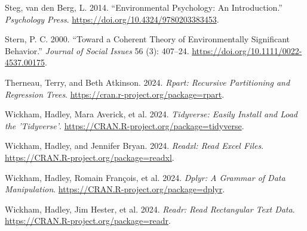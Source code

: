 \documentclass[
  letterpaper,
  DIV=11,
  numbers=noendperiod]{scrartcl}
\newlength{\cslhangindent}
\newenvironment{CSLReferences}[2] %
 {\begin{list}{}{%
  \setlength{\itemindent}{0pt}
  \setlength{\leftmargin}{0pt}
  \setlength{\parsep}{0pt}
  \ifodd #1
   \setlength{\leftmargin}{\cslhangindent}
   \setlength{\itemindent}{-1\cslhangindent}
  \fi
  \setlength{\itemsep}{#2\baselineskip}}}
 {\end{list}}
\begin{document}
\begin{CSLReferences}{1}{0}
Steg, van den Berg, L. 2014. {``Environmental Psychology: An
Introduction.''} \emph{Psychology Press}.
\url{https://doi.org/10.4324/9780203383453}.

Stern, P. C. 2000. {``Toward a Coherent Theory of Environmentally
Significant Behavior.''} \emph{Journal of Social Issues} 56 (3):
407--24. \url{https://doi.org/10.1111/0022-4537.00175}.

Therneau, Terry, and Beth Atkinson. 2024. \emph{Rpart: Recursive
Partitioning and Regression Trees}.
\url{https://cran.r-project.org/package=rpart}.

Wickham, Hadley, Mara Averick, et al. 2024. \emph{Tidyverse: Easily
Install and Load the 'Tidyverse'}.
\url{https://CRAN.R-project.org/package=tidyverse}.

Wickham, Hadley, and Jennifer Bryan. 2024. \emph{Readxl: Read Excel
Files}. \url{https://CRAN.R-project.org/package=readxl}.

Wickham, Hadley, Romain François, et al. 2024. \emph{Dplyr: A Grammar of
Data Manipulation}. \url{https://CRAN.R-project.org/package=dplyr}.

Wickham, Hadley, Jim Hester, et al. 2024. \emph{Readr: Read Rectangular
Text Data}. \url{https://CRAN.R-project.org/package=readr}.

\end{CSLReferences}
\end{document}
